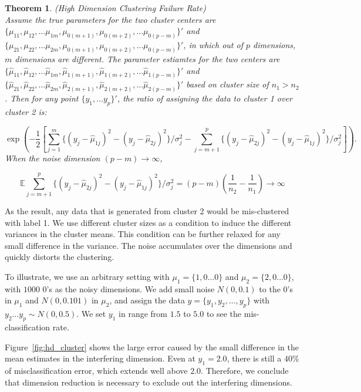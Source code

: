 \documentclass[12pt]{article}
\newtheorem{theorem}{Theorem}
\newcommand{\bb}[1]{\mathbb{#1}}
\begin{document}
\begin{theorem} (High Dimension Clustering Failure Rate)\\
Assume the true parameters for the two cluster centers are $\{\mu_{11},\mu_{12},\ldots \mu_{1m},\mu_{0(m+1)},\mu_{0(m+2)},\ldots \mu_{0(p-m)}\}'$ and $\{\mu_{21},\mu_{22},\ldots \mu_{2m},\mu_{0(m+1)},\mu_{0(m+2)},\ldots \mu_{0(p-m)}\}'$, in which out of $p$ dimensions, $m$ dimensions are different. The parameter estiamtes for the two centers are $\{\hat\mu_{11},\hat\mu_{12},\ldots \hat\mu_{1m},\hat\mu_{1(m+1)},\hat\mu_{1(m+2)},\ldots \hat\mu_{1(p-m)}\}'$ and $\{\hat\mu_{21},\hat\mu_{22},\ldots \hat\mu_{2m},\hat\mu_{2(m+1)},\hat\mu_{2(m+2)},\ldots \hat\mu_{2(p-m)}\}'$ based on cluster size of $n_1>n_2$.  Then for any point $\{ y_1,\ldots y_p\}'$, the ratio of assigning the data to cluster 1 over  cluster 2 is:

$$ \exp \left ( - \frac{1}{2} \left [ \sum_{j=1}^m \{ (y_{j}-\hat\mu_{1j})^2 - (y_{j}-\hat\mu_{2j})^2\}/\sigma^2_j - \sum_{j=m+1}^{p} \{  (y_{j}-\hat\mu_{2j})^2 -(y_{j}-\hat\mu_{1j})^2 \}/\sigma^2_j \right]\right).$$
When the noise dimension ${(p-m)\rightarrow \infty}$,

$$\bb E \sum_{j=m+1}^{p} \{  (y_{j}-\hat\mu_{2j})^2 -(y_{j}-\hat\mu_{1j})^2\}/\sigma^2_j  = (p-m)(\frac{1}{n_2}-\frac{1}{n_1}) \rightarrow \infty $$
\end{theorem}

As the result, any data that is generated from cluster 2 would be mis-clustered with label 1. We use different cluster sizes as a condition to induce the different variances in the cluster means. This condition can be further relaxed for any small difference in the variance. The noise accumulates over the dimensions and quickly distorts the clustering.

To illustrate, we use an arbitrary setting with $\mu_1= \{1, 0\ldots 0\}$ and $\mu_2= \{2, 0\ldots 0\}$, with $1000$ $0$'s as the noisy dimensions. We add small noise $N(0,0.1)$ to the $0$'s in $\mu_1$ and $N(0,0.101)$ in $\mu_2$, and assign the data $y=\{y_1,y_2,\ldots, y_p\}$ with $y_2\ldots y_p \sim N(0, 0.5)$. We set $y_1$ in range from $1.5$ to $5.0$ to see the mis-classification rate.

Figure~\ref{fig:hd_cluster} shows the large error caused by the small difference in the mean estimates in the interfering dimension. Even at $y_1=2.0$, there is still a $40\%$ of misclassification error, which extends well above $2.0$. Therefore, we conclude that dimension reduction is necessary to exclude out the interfering dimensions.
\end{document}
